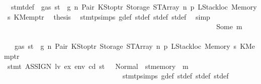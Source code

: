 \begin{isabellebody}
\ {}{\isacharparenleft}{\kern0pt}{}{\isacharparenright}{\kern0pt}\ stmt{\isacharunderscore}{\kern0pt}def\ {\isacharbackquoteopen}{\isasymnot}\ gas\ st\ {\isasymle}\ g{\isacharbackquoteclose}\ n\ Pair\ KStoptr\ Storage\ STArray\ n{}\ p{}\ LStackloc\ Memory\ s{}\ KMemptr\ \isamarkupfalse%
\ {\isacharquery}{\kern0pt}thesis\ \isamarkupfalse%
\ stmt{\isachardot}{\kern0pt}psimps{\isacharparenleft}{\kern0pt}{}{\isacharparenright}{\kern0pt}\ g{\isacharunderscore}{\kern0pt}def\ st{\isacharprime}{\kern0pt}{\isacharunderscore}{\kern0pt}def\ st{\isacharprime}{\kern0pt}{\isacharprime}{\kern0pt}{\isacharunderscore}{\kern0pt}def\ st{\isacharprime}{\kern0pt}{\isacharprime}{\kern0pt}{\isacharprime}{\kern0pt}{\isacharunderscore}{\kern0pt}def\ \isamarkupfalse%
\ simp\isanewline
\ \ \ \ \ \ \ \ \ \ \ \ \ \ \ \ \ \ \ \ \ \ \ \ \ \ \ \ \isamarkupfalse%
\isanewline
\ \ \ \ \ \ \ \ \ \ \ \ \ \ \ \ \ \ \ \ \ \ \ \ \ \ \ \ \ \ \isamarkupfalse%
\ {\isacharparenleft}{\kern0pt}Some\ m{\isacharparenright}{\kern0pt}\isanewline
\ \ \ \ \ \ \ \ \ \ \ \ \ \ \ \ \ \ \ \ \ \ \ \ \ \ \ \ \ \ \isamarkupfalse%
\ {}{\isacharparenleft}{\kern0pt}{}{\isacharparenright}{\kern0pt}\ {\isacharbackquoteopen}{\isasymnot}\ gas\ st\ {\isasymle}\ g{\isacharbackquoteclose}\ n\ Pair\ KStoptr\ Storage\ STArray\ n{}\ p{}\ LStackloc\ Memory\ s{}\ KMemptr\isanewline
\ \ \ \ \ \ \ \ \ \ \ \ \ \ \ \ \ \ \ \ \ \ \ \ \ \ \ \ \ \ \isamarkupfalse%
\ {\isachardoublequoteopen}stmt\ {\isacharparenleft}{\kern0pt}ASSIGN\ lv\ ex{\isacharparenright}{\kern0pt}\ env\ cd\ st\ {\isacharequal}{\kern0pt}\ \ Normal\ {\isacharparenleft}{\kern0pt}{\isacharparenleft}{\kern0pt}{\isacharparenright}{\kern0pt}{\isacharcomma}{\kern0pt}\ st{\isacharprime}{\kern0pt}{\isacharprime}{\kern0pt}{\isacharprime}{\kern0pt}{\isasymlparr}memory\ {\isacharcolon}{\kern0pt}{\isacharequal}{\kern0pt}\ m{\isasymrparr}{\isacharparenright}{\kern0pt}{\isachardoublequoteclose}\isanewline
\ \ \ \ \ \ \ \ \ \ \ \ \ \ \ \ \ \ \ \ \ \ \ \ \ \ \ \ \ \ \ \ \isamarkupfalse%
\ stmt{\isachardot}{\kern0pt}psimps{\isacharparenleft}{\kern0pt}{}{\isacharparenright}{\kern0pt}\ g{\isacharunderscore}{\kern0pt}def\ st{\isacharprime}{\kern0pt}{\isacharunderscore}{\kern0pt}def\ st{\isacharprime}{\kern0pt}{\isacharprime}{\kern0pt}{\isacharunderscore}{\kern0pt}def\ st{\isacharprime}{\kern0pt}{\isacharprime}{\kern0pt}{\isacharprime}{\kern0pt}{\isacharunderscore}{\kern0pt}def\ \isamarkupfalse%

\end{isabellebody}
